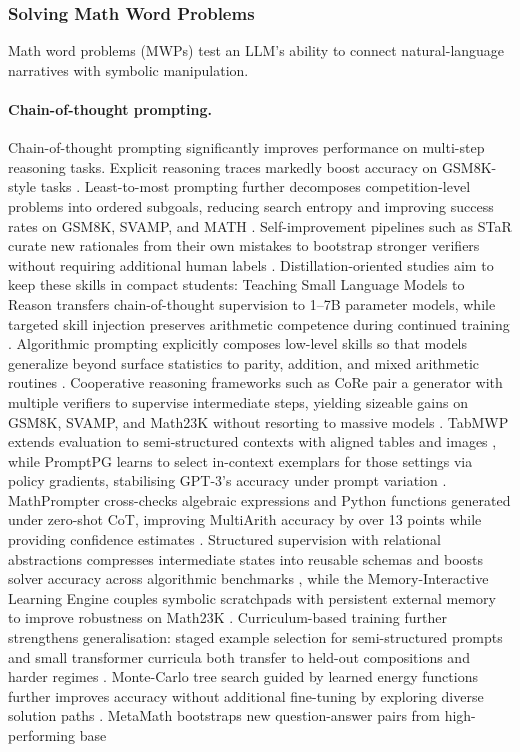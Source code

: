 \documentclass[acmsmall,anonymous]{acmart}
\begin{document}
\subsubsection{Solving Math Word Problems}\label{sec:mwp}
Math word problems (MWPs) test an LLM’s ability to connect natural-language narratives with symbolic manipulation.  

\paragraph{Chain-of-thought prompting.}
Chain-of-thought prompting significantly improves performance on multi-step reasoning tasks.
Explicit reasoning traces markedly boost accuracy on GSM8K-style tasks \cite{wei2022chain}.  Least-to-most prompting further decomposes competition-level problems into ordered subgoals, reducing search entropy and improving success rates on GSM8K, SVAMP, and MATH \cite{zhou-2023-least}.  Self-improvement pipelines such as STaR curate new rationales from their own mistakes to bootstrap stronger verifiers without requiring additional human labels \cite{zelikman-2022-star}.  Distillation-oriented studies aim to keep these skills in compact students: Teaching Small Language Models to Reason transfers chain-of-thought supervision to 1–7B parameter models, while targeted skill injection preserves arithmetic competence during continued training \cite{magister-2023-teaching,sharma-2022-skill-injection}.  Algorithmic prompting explicitly composes low-level skills so that models generalize beyond surface statistics to parity, addition, and mixed arithmetic routines \cite{zhou-2022-teaching-algorithmic}.  Cooperative reasoning frameworks such as CoRe pair a generator with multiple verifiers to supervise intermediate steps, yielding sizeable gains on GSM8K, SVAMP, and Math23K without resorting to massive models \cite{zhu-2023-core}.  TabMWP extends evaluation to semi-structured contexts with aligned tables and images \cite{lu-2022-tabmwp}, while PromptPG learns to select in-context exemplars for those settings via policy gradients, stabilising GPT-3's accuracy under prompt variation \cite{lu-2023-dynamic-prompt}.  MathPrompter cross-checks algebraic expressions and Python functions generated under zero-shot CoT, improving MultiArith accuracy by over 13 points while providing confidence estimates \cite{imani-2023-mathprompter}.  Structured supervision with relational abstractions compresses intermediate states into reusable schemas and boosts solver accuracy across algorithmic benchmarks \cite{nam-2022-relational-abstractions}, while the Memory-Interactive Learning Engine couples symbolic scratchpads with persistent external memory to improve robustness on Math23K \cite{wu-2022-mile}.  Curriculum-based training further strengthens generalisation: staged example selection for semi-structured prompts and small transformer curricula both transfer to held-out compositions and harder regimes \cite{nam-2022-ood-curriculum,nam-2022-ood-transformers}. Monte-Carlo tree search guided by learned energy functions further improves accuracy without additional fine-tuning by exploring diverse solution paths \cite{xu-2023-no-train}.  MetaMath bootstraps new question-answer pairs from high-performing base 
\end{document}
